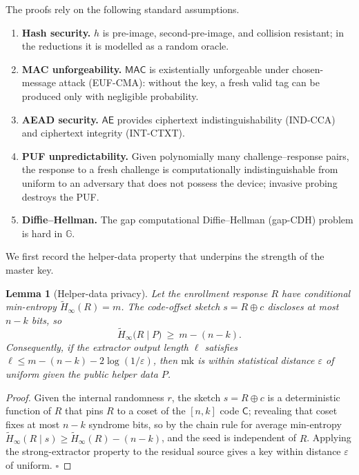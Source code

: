 \documentclass[11pt,a4paper]{article}
\newtheorem{lemma}[theorem]{Lemma}
\begin{document}
The proofs rely on the following standard assumptions.
\begin{enumerate}[leftmargin=*]
  \item \textbf{Hash security.} $h$ is pre-image, second-pre-image, and
  collision resistant; in the reductions it is modelled as a random oracle.
  \item \textbf{MAC unforgeability.} $\mathsf{MAC}$ is existentially unforgeable
  under chosen-message attack (EUF-CMA): without the key, a fresh valid tag can
  be produced only with negligible probability.
  \item \textbf{AEAD security.} $\mathsf{AE}$ provides ciphertext
  indistinguishability (IND-CCA) and ciphertext integrity (INT-CTXT).
  \item \textbf{PUF unpredictability.} Given polynomially many
  challenge--response pairs, the response to a fresh challenge is
  computationally indistinguishable from uniform to an adversary that does not
  possess the device; invasive probing destroys the PUF.
  \item \textbf{Diffie--Hellman.} The gap computational Diffie--Hellman
  (gap-CDH) problem is hard in $\mathbb{G}$.
\end{enumerate}

We first record the helper-data property that underpins the strength of the
master key.

\begin{lemma}[Helper-data privacy]
\label{lem:helper}
Let the enrollment response $R$ have conditional min-entropy $\widetilde{H}_\infty(R)=m$.
The code-offset sketch $s=R\oplus c$ discloses at most $n-k$ bits, so
\begin{equation}
\widetilde{H}_\infty\big(R \mid P\big)\ \ge\ m-(n-k).
\end{equation}
Consequently, if the extractor output length $\ell$ satisfies
$\ell \le m-(n-k)-2\log(1/\varepsilon)$, then $\text{mk}$ is within statistical
distance $\varepsilon$ of uniform given the public helper data $P$.
\end{lemma}

\begin{proof}
Given the internal randomness $r$, the sketch $s=R\oplus c$ is a deterministic
function of $R$ that pins $R$ to a coset of the $[n,k]$ code $\mathsf{C}$;
revealing that coset fixes at most $n-k$ syndrome bits, so by the chain rule for
average min-entropy $\widetilde{H}_\infty(R\mid s)\ge \widetilde{H}_\infty(R)-(n-k)$, and the seed is
independent of $R$. Applying the strong-extractor property to the residual
source gives a key within distance $\varepsilon$ of uniform. \hfill$\square$
\end{proof}
\end{document}
